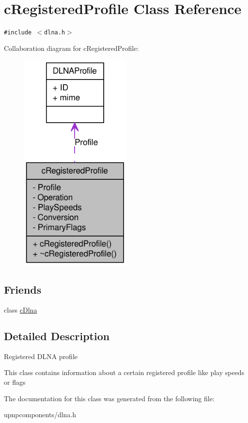 \hypertarget{classcRegisteredProfile}{
\section{cRegisteredProfile Class Reference}
\label{classcRegisteredProfile}
}
{\tt \#include $<$dlna.h$>$}

Collaboration diagram for cRegisteredProfile:\nopagebreak
\begin{figure}[H]
\begin{center}
\leavevmode
\includegraphics[width=160pt]{classcRegisteredProfile__coll__graph}
\end{center}
\end{figure}
\subsection*{Friends}
\begin{CompactItemize}
\item 
\hypertarget{classcRegisteredProfile_b201121ee660bd628a4844e8e50690db}{
class \hyperlink{classcRegisteredProfile_b201121ee660bd628a4844e8e50690db}{cDlna}}
\label{classcRegisteredProfile_b201121ee660bd628a4844e8e50690db}

\end{CompactItemize}


\subsection{Detailed Description}
Registered DLNA profile

This class contains information about a certain registered profile like play speeds or flags 

The documentation for this class was generated from the following file:\begin{CompactItemize}
\item 
upnpcomponents/dlna.h\end{CompactItemize}
